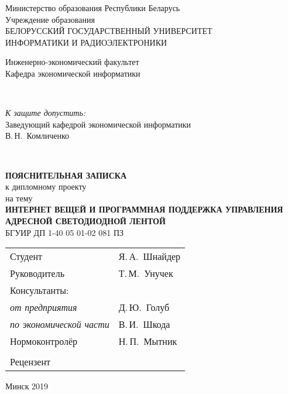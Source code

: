 \begin{titlepage}
  \begin{center}
    Министерство образования Республики Беларусь\\[1em]
    Учреждение образования\\
    БЕЛОРУССКИЙ ГОСУДАРСТВЕННЫЙ УНИВЕРСИТЕТ \\
    ИНФОРМАТИКИ И РАДИОЭЛЕКТРОНИКИ\\[1em]

    \begin{minipage}{\textwidth}
      \begin{flushleft}
          Инженерно-экономический факультет\\
          Кафедра экономической информатики\\
      \end{flushleft}
    \end{minipage}\\[3em]

    \begin{flushright}
      \begin{minipage}{0.45\textwidth}
        \textit{К защите допустить:}\\[0.8em]
        Заведующий кафедрой \newline экономической информатики\\[0.45em]
        \underline{\hspace*{2.8cm}} В.\,Н.~Комличенко
      \end{minipage}\\[2.2em]
    \end{flushright}

    \textbf{ПОЯСНИТЕЛЬНАЯ ЗАПИСКА}\\
    {к дипломному проекту}\\
    {на тему}\\[3em]
    \textbf{\large\MakeUppercase{Интернет вещей и программная поддержка управления адресной светодиодной лентой}}\\[1em]


    {БГУИР ДП  1-40 05 01-02 081 ПЗ}\\[2em]
    
    \begin{tabular}{ p{}p{} }
      Студент & Я.\,А.~Шнайдер \\
      Руководитель & Т.\,М.~Унучек \\
      Консультанты: &\\
      \hspace*{3ex}\emph{от предприятия} & Д.\,Ю.~Голуб \\
      \hspace*{3ex}\emph{по экономической части} & В.\,И.~Шкода \\
      Нормоконтролёр & Н.\,П.~Мытник\\
      & \\
      Рецензент &
    \end{tabular}
    
    \vfill
    {\normalsize Минск 2019}
  \end{center}
\end{titlepage}
